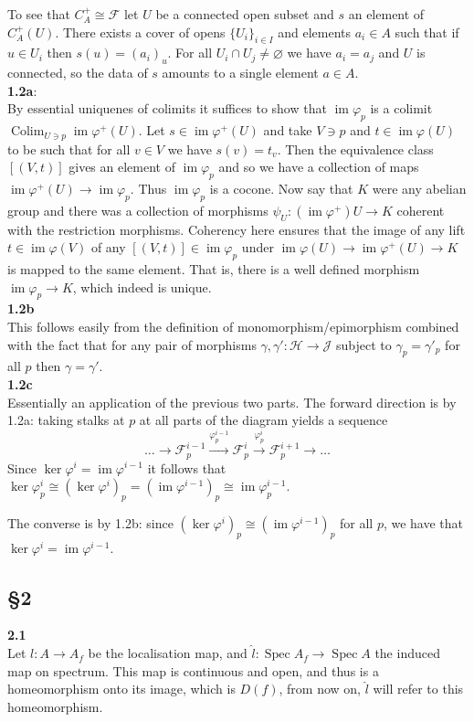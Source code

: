 \documentclass[12pt]{article}
\numberwithin{thm}{subsection}
\numberwithin{defn}{subsection}
\numberwithin{lemma}{subsection}
\numberwithin{example}{subsection}
\numberwithin{notation}{subsection}
\numberwithin{cor}{subsection}
\numberwithin{remark}{subsection}
\numberwithin{condition}{subsection}
\numberwithin{question}{subsection}
\numberwithin{construction}{subsection}
\numberwithin{construction}{subsection}
\numberwithin{construction}{subsection}
\newcommand{\scr}[1]{\mathscr{#1}}
\newcommand{\lto}{\longrightarrow}
\newcommand{\im}{\operatorname{im}}
\newcommand{\spec}{\operatorname{Spec}}
\begin{document}
To see that $C_A^+ \cong \scr{F}$ let $U$ be a connected open subset and $s$ an element of $C_A^+(U)$. There exists a cover of opens $\lbrace U_i\rbrace_{i \in I}$ and elements $a_i \in A$ such that if $u \in U_i$ then $s(u) = (a_i)_u$. For all $U_i \cap U_j \neq \varnothing$ we have $a_i = a_j$ and $U$ is connected, so the data of $s$ amounts to a single element $a \in A$.\\
\textbf{1.2a}:\\
By essential uniquenes of colimits it suffices to show that $\im\varphi_p$ is a colimit $\operatorname{Colim}_{U \ni p}\im\varphi^+(U)$. Let $s \in \im\varphi^+(U)$ and take $V \ni p$ and $t \in \im\varphi(U)$ to be such that for all $v \in V$ we have $s(v) = t_v$. Then the equivalence class $[(V,t)]$ gives an element of $\im\varphi_p$ and so we have a collection of maps $\im\varphi^+(U) \to \im\varphi_p$. Thus $\im\varphi_p$ is a cocone. Now say that $K$ were any abelian group and there was a collection of morphisms $\psi_U: (\im\varphi^+)U \to K$ coherent with the restriction morphisms. Coherency here ensures that the image of any lift $t \in \im\varphi(V)$ of any $[(V,t)] \in \im\varphi_p$ under $\im\varphi(U) \lto \im\varphi^+(U) \lto K$ is mapped to the same element. That is, there is a well defined morphism $\im\varphi_p \to K$, which indeed is unique.\\
\textbf{1.2b}\\
This follows easily from the definition of monomorphism/epimorphism combined with the fact that for any pair of morphisms $\gamma,\gamma': \scr{H} \to \scr{J}$ subject to $\gamma_p = \gamma'_p$ for all $p$ then $\gamma = \gamma'$.\\
\textbf{1.2c}\\
Essentially an application of the previous two parts. The forward direction is by 1.2a: taking stalks at $p$ at all parts of the diagram yields a sequence
\[\hdots\lto \scr{F}^{i-1}_p \stackrel{\varphi^{i-1}_p}{\lto} \scr{F}^i_p \stackrel{\varphi^i_p}{\lto}\scr{F}^{i+1}_p \lto \hdots\]
Since $\ker\varphi^i = \im\varphi^{i-1}$ it follows that $\ker\varphi^i_p \cong (\ker\varphi^i)_p = (\im\varphi^{i-1})_p \cong \im\varphi^{i-1}_p$.

The converse is by 1.2b: since $(\ker\varphi^i)_p \cong (\im\varphi^{i-1})_p$ for all $p$, we have that $\ker\varphi^i = \im\varphi^{i-1}$.

\subsection{\S 2}
\textbf{2.1}\\
Let $l: A \to A_f$ be the localisation map, and $\hat{l}: \spec A_f \to \spec A$ the induced map on spectrum. This map is continuous and open, and thus is a homeomorphism onto its image, which is $D(f)$, from now on, $\hat{l}$ will refer to this homeomorphism.\\
\end{document}
